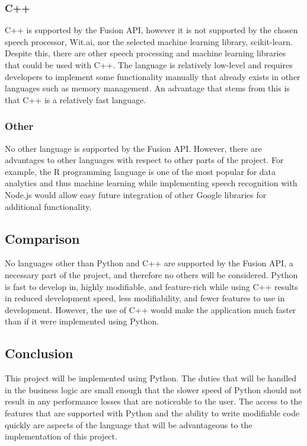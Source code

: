 \documentclass[onecolumn, draftclsnofoot,10pt, compsoc]{IEEEtran}
\begin{document}
        \subsubsection{C++}
            C++ is supported by the Fusion API, however it is not supported by the chosen speech processor, Wit.ai, nor the selected machine learning library, scikit-learn.
            Despite this, there are other speech processing and machine learning libraries that could be used with C++. 
            The language is relatively low-level and requires developers to implement some functionality manually that already exists in other languages such as memory management. 
            An advantage that stems from this is that C++ is a relatively fast language\cite{PyCppSpeedBenchmarks}.
        \subsubsection{Other}
            No other language is supported by the Fusion API.
            However, there are advantages to other languages with respect to other parts of the project. 
            For example, the R programming language is one of the most popular for data analytics and thus machine learning\cite{MLLang} while implementing speech recognition with Node.js would allow easy future integration of other Google libraries for additional functionality.
        
    \subsection{Comparison}
        No languages other than Python and C++ are supported by the Fusion API\cite{AutodeskCreateScript}, a necessary part of the project, and therefore no others will be considered. 
        Python is fast to develop in, highly modifiable, and feature-rich while using C++ results in reduced development speed, less modifiability, and fewer features to use in development. 
        However, the use of C++ would make the application much faster than if it were implemented using Python.
    
    \subsection{Conclusion}
        This project will be implemented using Python. 
        The duties that will be handled in the business logic are small enough that the slower speed of Python should not result in any performance losses that are noticeable to the user. 
        The access to the features that are supported with Python and the ability to write modifiable code quickly are aspects of the language that will be advantageous to the implementation of this project.

\clearpage


\end{document}
